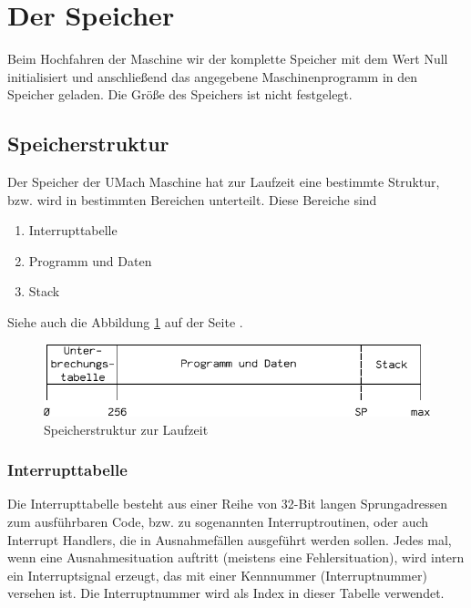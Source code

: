 \section{Der Speicher}
\label{sec:Speicher}

Beim Hochfahren der Maschine wir der komplette Speicher mit dem
Wert Null initialisiert und anschließend das angegebene Maschinenprogramm in den
Speicher geladen. Die Größe des Speichers ist nicht festgelegt.



\subsection{Speicherstruktur}
\label{subsec:Speicherstruktur}

Der Speicher der UMach Maschine hat zur Laufzeit eine bestimmte Struktur, bzw.
wird in bestimmten Bereichen unterteilt. Diese Bereiche sind
\begin{enumerate}
 \item Interrupttabelle
 \item Programm und Daten
 \item Stack
\end{enumerate}

Siehe auch die Abbildung \ref{fig:Speicherstruktur} auf der Seite
\pageref{fig:Speicherstruktur}.

\begin{figure}[htp]
 \centering
 \includegraphics{./img/UMach-Speicherstruktur}
 \caption[Speicherstruktur]{Speicherstruktur zur Laufzeit}
 \label{fig:Speicherstruktur}
\end{figure}



\subsubsection{Interrupttabelle}
\label{subsubsec:Interrupttabelle}

Die Interrupttabelle besteht aus einer Reihe von 32-Bit langen Sprungadressen
zum ausführbaren Code, bzw. zu sogenannten Interruptroutinen, oder auch \glqq
Interrupt Handlers\grqq, die in Ausnahmefällen ausgeführt werden sollen. Jedes
mal, wenn eine Ausnahmesituation auftritt (meistens eine Fehlersituation), wird
intern ein Interruptsignal erzeugt, das mit einer Kennnummer (Interruptnummer)
versehen ist. Die Interruptnummer wird als Index in dieser Tabelle verwendet.


